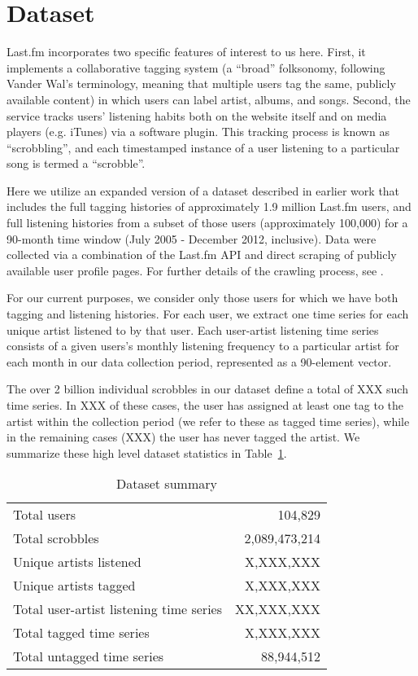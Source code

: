 \section{Dataset}
\label{sec_dataset}
Last.fm incorporates two specific features of interest to us here. First, it implements a collaborative tagging system (a ``broad'' folksonomy, following Vander Wal's \cite{VanderWal2005} terminology, meaning that multiple users tag the same, publicly available content) in which users can label artist, albums, and songs. Second, the service tracks users' listening habits both on the website itself and on media players (e.g. iTunes) via a software plugin. This tracking process is known as ``scrobbling'', and each timestamped instance of a user listening to a particular song is termed a ``scrobble''.

Here we utilize an expanded version of a dataset described in earlier work \cite{Lorince2013,Lorince2014} that includes the full tagging histories of approximately 1.9 million Last.fm users, and full listening histories from a subset of those users (approximately 100,000) for a 90-month time window (July 2005 - December 2012, inclusive). Data were collected via a combination of the Last.fm API and direct scraping of publicly available user profile pages. For further details of the crawling process, see \cite{Lorince2013,Lorince2014}.

For our current purposes, we consider only those users for which we have both tagging and listening histories. For each user, we extract one time series for each unique artist listened to by that user. Each user-artist listening time series consists of a given users's monthly listening frequency to a particular artist for each month in our data collection period, represented as a 90-element vector. 

The over 2 billion individual scrobbles in our dataset define a total of XXX such time series. In XXX of these cases, the user has assigned at least one tag to the artist within the collection period (we refer to these as tagged time series), while in the remaining cases (XXX) the user has never tagged the artist. We summarize these high level dataset statistics in Table~\ref{tab:data_summary}.

\begin{table}[h]
\begin{center}
\begin{tabular}{l|r}
\toprule
Total users & 104,829 \\
Total scrobbles & 2,089,473,214 \\
Unique artists listened & X,XXX,XXX \\
Unique artists tagged & X,XXX,XXX \\
\midrule
Total user-artist listening time series & XX,XXX,XXX \\
Total tagged time series & X,XXX,XXX \\
Total untagged time series & 88,944,512 \\
\bottomrule
\end{tabular}
\end{center}
\caption{Dataset summary}
\label{tab:data_summary}
\end{table}